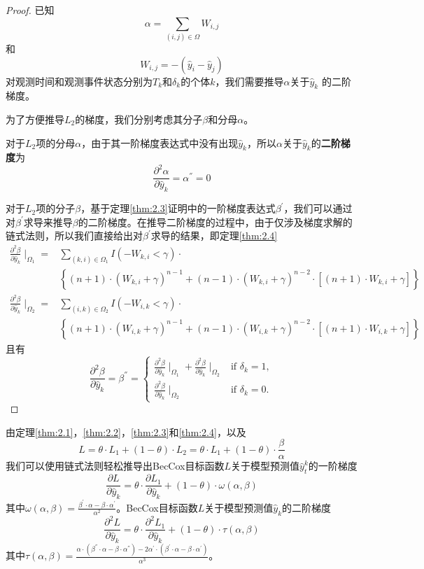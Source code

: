 \begin{proof}
已知$$\alpha = \sum_{(i,j)\in \Omega} W_{i,j}$$ 和 $$W_{i,j}=-(\hat{y}_i-\hat{y}_j)$$对观测时间和观测事件状态分别为$T_k$和$\delta_k$的个体$k$，我们需要推导$\alpha$关于$\hat{y}_k$ 的二阶梯度。

为了方便推导$L_2$的梯度，我们分别考虑其分子$\beta$和分母$\alpha$。

对于$L_2$项的分母$\alpha$，由于其一阶梯度表达式中没有出现$\hat{y}_k$，所以$\alpha$关于$\hat{y}_k$的\textbf{二阶梯度}为$$
\frac{\partial^2 \alpha}{\partial \hat{y}_k}=\alpha^{''}=0
$$

对于$L_2$项的分子$\beta$，基于定理\ref{thm:2.3}证明中的一阶梯度表达式$\beta^{'}$，我们可以通过对$\beta^{'}$求导来推导$\beta$的二阶梯度。在推导二阶梯度的过程中，由于仅涉及梯度求解的链式法则，所以我们直接给出对$\beta^{'}$求导的结果，即定理\ref{thm:2.4}\[
\begin{split}
\frac{\partial^2 \beta}{\partial \hat{y}_k} \mid_{\Omega_1} =& \sum\limits_{(k,i)\in \Omega_1} I(-W_{k,i}<\gamma)\cdot \\
  & \left\{(n+1)\cdot (W_{k,i}+\gamma)^{n-1} + (n-1)\cdot (W_{k,i}+\gamma)^{n-2}\cdot [(n+1)\cdot W_{k,i}+\gamma]\right\} \\
\frac{\partial^2 \beta}{\partial \hat{y}_k} \mid_{\Omega_2} =& \sum\limits_{(i,k)\in \Omega_2} I(-W_{i,k}<\gamma)\cdot \\
  & \left\{(n+1)\cdot (W_{i,k}+\gamma)^{n-1} + (n-1)\cdot (W_{i,k}+\gamma)^{n-2}\cdot [(n+1)\cdot W_{i,k}+\gamma]\right\}
\end{split}
\] 且有$$
\frac{\partial^2 \beta}{\partial \hat{y}_k}=\beta^{''}=
\begin{cases}
\frac{\partial^2 \beta}{\partial \hat{y}_k} \mid_{\Omega_1} + \frac{\partial^2 \beta}{\partial \hat{y}_k} \mid_{\Omega_2} & \text{if } \delta_k = 1,\\
\frac{\partial^2 \beta}{\partial \hat{y}_k} \mid_{\Omega_2} & \text{if } \delta_k = 0.
\end{cases}
$$
\end{proof}

由定理\ref{thm:2.1}，\ref{thm:2.2}，\ref{thm:2.3}和\ref{thm:2.4}，以及
\begin{equation}
L=\theta\cdot L_1 + (1-\theta)\cdot L_2= \theta\cdot L_1 + (1-\theta)\cdot \frac{\beta}{\alpha}
\end{equation}
我们可以使用链式法则轻松推导出BecCox目标函数$L$关于模型预测值$\hat{y}_t^k$的一阶梯度
\begin{equation}
\frac{\partial L}{\partial \hat{y}_k}=\theta\cdot \frac{\partial L_1}{\partial \hat{y}_k} + (1-\theta)\cdot \omega(\alpha, \beta)
\end{equation}
其中$\omega(\alpha, \beta)=\frac{\beta^{'}\cdot \alpha - \beta\cdot \alpha^{'}}{\alpha^2}$。BecCox目标函数$L$关于模型预测值$\hat{y}_k$的二阶梯度
\begin{equation}
\frac{\partial^2 L}{\partial \hat{y}_k}=\theta\cdot \frac{\partial^2 L_1}{\partial \hat{y}_k} + (1-\theta)\cdot \tau(\alpha, \beta)
\end{equation} 
其中$\tau(\alpha, \beta)=\frac{\alpha\cdot (\beta^{''}\cdot \alpha - \beta\cdot \alpha^{''})-2\alpha^{'}\cdot (\beta^{'}\cdot \alpha - \beta\cdot \alpha^{'})}{\alpha^3}$。

